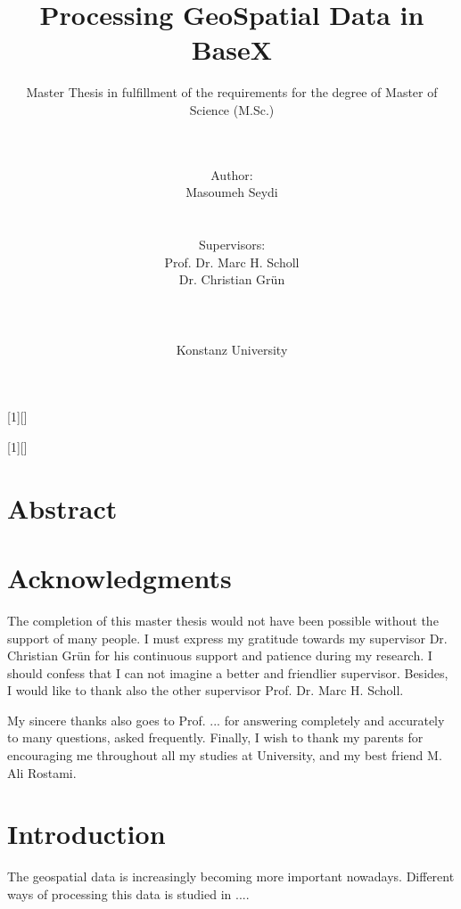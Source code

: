 \documentclass[a4paper,12pt]{article}
\title{Processing GeoSpatial Data in BaseX}
\subtitle{Master Thesis in fulfillment of the requirements for the degree of
Master of Science (M.Sc.)}
\author{\\\\Author: \\
	Masoumeh Seydi
	\\\\\\Supervisors: \\
	Prof. Dr. Marc H. Scholl \\ 
	Dr. Christian Gr{\"u}n \\
	\\\\\\
	Konstanz University}
\begin{document}
[1][]{
\lstset{#1}}{}

[1][]{
\lstset{#1}}{}


\renewcommand{\lstlistingname}{Code}


\maketitle
\thispagestyle{empty}

\newpage
\section*{Abstract}

\thispagestyle{empty}

\newpage
\section*{Acknowledgments}
\thispagestyle{empty}

The completion of this master thesis would not have been possible 
without the support of many people. 
I must express my gratitude towards my supervisor 
Dr. Christian Gr{\"u}n for his continuous support and patience during my research.
I should confess that I can not imagine a better and friendlier
supervisor. Besides, I would like to thank also the other supervisor
Prof. Dr. Marc H. Scholl.

My sincere thanks also goes to Prof. ...  for
answering completely and accurately to many questions, asked
frequently. Finally, I wish to thank my parents for encouraging me 
throughout all my studies at University, and my best friend M. Ali Rostami.


\newpage
\tableofcontents

\thispagestyle{empty}
\newpage
\section{Introduction}
\setcounter{page}{1}
The geospatial data is increasingly becoming more important nowadays.
Different ways of processing this data is studied in ....
\end{document}
